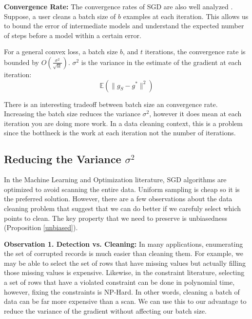 \vspace{0.5em}

\noindent\textbf{ Convergence Rate: } The convergence rates of SGD are also well analyzed \cite{dekel2012optimal,bertsekas2011incremental,zhao2014stochastic}. 
Suppose, a user cleans a batch size of $b$ examples at each iteration.
This allows us to bound the error of intermediate models and understand the expected number of steps before a model within a certain error. 

\begin{proposition}
For a general convex loss, a batch size $b$, and $t$ iterations, the convergence rate is bounded by $O(\frac{\sigma^2}{\sqrt{bt}})$. 
$\sigma^2$ is the variance in the estimate of the gradient at each iteration:
\[
\mathbb{E}(\|g_S - g^*\|^2)
\]
\end{proposition}

There is an interesting tradeoff between batch size an convergence rate.
Increasing the batch size reduces the variance $\sigma^2$, however it does
mean at each iteration you are doing more work.
In a data cleaning context, this is a problem since the bottlneck is the work at 
each iteration not the number of iterations.

\subsection{Reducing the Variance $\sigma^2$}\label{dist-samp}
In the Machine Learning and Optimization literature, SGD algorithms are optimized to avoid scanning the entire data.
Uniform sampling is cheap so it is the preferred solution.
However, there are a few observations about the data cleaning problem that suggest that we can do better if we carefuly select which points to clean.
The key property that we need to preserve is unbiasedness (Proposition \ref{unbiased}).

\vspace{0.5em}

\noindent\textbf{Observation 1. Detection vs. Cleaning: } In many applications, enumerating the set of corrupted records is much easier than cleaning them. For example, we may be able to select the set of rows that have missing values but actually filling those missing values is expensive. Likewise, in the constraint literature, selecting a set of rows that have a violated constraint can be done in polynomial time, however, fixing the constraints is NP-Hard.
In other words, cleaning a batch of data can be far more expensive than a scan.
We can use this to our advantage to reduce the variance of the gradient without affecting our batch size.

